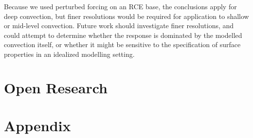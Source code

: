 \documentclass[draft]{agujournal2019}
\begin{document}
Because we used perturbed forcing on an RCE base, the conclusions apply for deep
convection, but finer resolutions would be required for application to shallow
or mid-level convection. Future work should investigate finer resolutions, and
could attempt to determine whether the response is dominated by the modelled
convection itself, or whether it might be sensitive to the specification of
surface properties in an idealized modelling setting.

\section{Open Research}



%



\newpage
\section*{Appendix}
\setcounter{figure}{0}
\renewcommand{\thefigure}{A\arabic{figure}}
\end{document}
